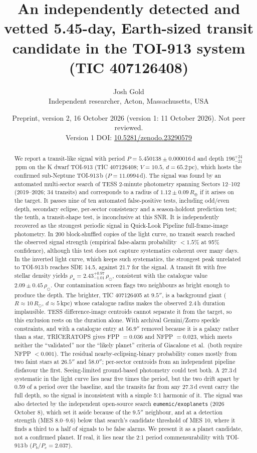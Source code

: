 \documentclass[11pt]{article}
\title{\textbf{An independently detected and vetted 5.45-day, Earth-sized transit candidate in the TOI-913 system (TIC 407126408)}}
\author{Josh Gold\\ \small Independent researcher, Acton, Massachusetts, USA}
\date{\small Preprint, version 2, 16 October 2026 (version 1: 11 October 2026). Not peer reviewed.\\ Version 1 DOI: \href{https://doi.org/10.5281/zenodo.23290579}{10.5281/zenodo.23290579}}
\begin{document}
\maketitle

\begin{abstract}
\noindent We report a transit-like signal with period $P = 5.450138 \pm 0.000016$\,d and depth $196^{+24}_{-21}$\,ppm on the K dwarf TOI-913 (TIC 407126408; $V=10.5$, $d=65.2$\,pc), which hosts the confirmed sub-Neptune TOI-913\,b ($P = 11.0994$\,d). The signal was found by an automated multi-sector search of TESS 2-minute photometry spanning Sectors 12--102 (2019--2026; 34 transits) and corresponds to a radius of $1.12 \pm 0.09\,R_\oplus$ if it arises on the target. It passes nine of ten automated false-positive tests, including odd/even depth, secondary eclipse, per-sector consistency and a season-holdout prediction test; the tenth, a transit-shape test, is inconclusive at this SNR. It is independently recovered as the strongest periodic signal in Quick-Look Pipeline full-frame-image photometry. In 200 block-shuffled copies of the light curve, no transit search reached the observed signal strength (empirical false-alarm probability $<1.5\%$ at 95\% confidence), although this test does not capture systematics coherent over many days. In the inverted light curve, which keeps such systematics, the strongest peak unrelated to TOI-913\,b reaches SDE 14.5, against 21.7 for the signal. A transit fit with free stellar density yields $\rho_\star = 2.43^{+0.97}_{-1.01}\,\rho_\odot$, consistent with the catalogue value $2.09 \pm 0.45\,\rho_\odot$. Our contamination screen flags two neighbours as bright enough to produce the depth. The brighter, TIC 407126405 at $9.5''$, is a background giant ($R\approx10\,R_\odot$, $d\approx5$\,kpc) whose catalogue radius makes the observed 2.4\,h duration implausible. TESS difference-image centroids cannot separate it from the target, so this exclusion rests on the duration alone. With archival Gemini/Zorro speckle constraints, and with a catalogue entry at $56.9''$ removed because it is a galaxy rather than a star, \textsc{TRICERATOPS} gives FPP $=0.036$ and NFPP $=0.023$, which meets neither the ``validated'' nor the ``likely planet'' criteria of Giacalone et al.\ (both require NFPP $<0.001$). The residual nearby-eclipsing-binary probability comes mostly from two faint stars at $26.5''$ and $58.0''$; per-sector centroids from an independent pipeline disfavour the first. Seeing-limited ground-based photometry could test both. A 27.3\,d systematic in the light curve lies near five times the period, but the two drift apart by 0.59 of a period over the baseline, and the transits far from any 27.3\,d event carry the full depth, so the signal is inconsistent with a simple 5:1 harmonic of it. The signal was also detected by the independent open-source search \texttt{eumemic/exoplanets} (2026 October 8), which set it aside because of the $9.5''$ neighbour, and at a detection strength (MES 8.0--9.6) below that search's candidate threshold of MES 10, where it finds a third to a half of signals to be false alarms. We present it as a planet candidate, not a confirmed planet. If real, it lies near the 2:1 period commensurability with TOI-913\,b ($P_b/P_c = 2.037$).
\end{abstract}
\end{document}
